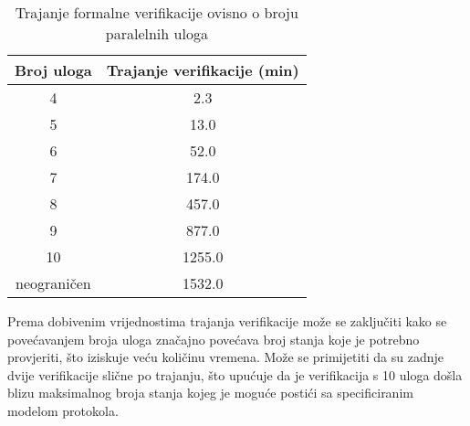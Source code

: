 \begin{table}[htb]
\caption{Trajanje formalne verifikacije ovisno o broju paralelnih uloga}
\renewcommand{\arraystretch}{1.25}
\label{tab:verif_dur}
\centering
\small
\begin{tabular}{ c  c }
\toprule
Broj uloga & Trajanje verifikacije (min)
    \\ \midrule
    4 & 2.3 
    \\ \hline
    5 & 13.0
    \\ \hline
    6 & 52.0
    \\ \hline
    7 & 174.0
    \\ \hline
    8 & 457.0
    \\ \hline
    9 & 877.0
    \\ \hline
    10 & 1255.0
    \\ \hline
    neograničen & 1532.0
    \\ \bottomrule
\end{tabular}
\end{table}

Prema dobivenim vrijednostima trajanja verifikacije može se zaključiti kako se
povećavanjem broja uloga značajno povećava broj stanja koje je potrebno
provjeriti, što iziskuje veću količinu vremena. Može se primijetiti da su
zadnje dvije verifikacije slične po trajanju, što upućuje da je verifikacija s
10 uloga došla blizu maksimalnog broja stanja kojeg je moguće postići sa
specificiranim modelom protokola.


